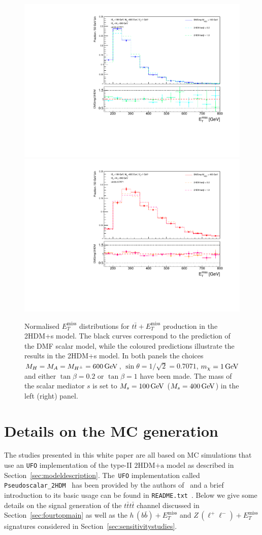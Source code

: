 \documentclass[a4paper, 11pt,notoc]{article}
\newcommand{\MET}{\ensuremath{E_T^\mathrm{miss}}\xspace}
\newcommand{\hdma}{\ensuremath{\textrm{2HDM+a}}\xspace}
\begin{document}
\begin{figure}
\centering
\includegraphics[width=.475\textwidth]{Met100GeV.pdf} \quad 
\includegraphics[width=.475\textwidth]{Met400GeV.pdf}
\vspace{2mm}
\caption{ Normalised $\MET$ distributions for $t \bar t + \MET$ production in the 2HDM+s model. The black curves correspond to the prediction of the DMF scalar   model, while the coloured predictions illustrate the results in the 2HDM+s  model. In both panels the choices $M_H = M_A = M_{H^\pm} = 600 \, {\rm GeV}$, $\sin\theta=1/\sqrt{2}=0.7071$, $m_\chi = 1 \, {\rm GeV}$ and either $\tan \beta = 0.2$ or $\tan \beta = 1$ have been made. The mass of the scalar mediator $s$ is set to $M_s = 100 \, {\rm GeV}$ ($M_s = 400 \, {\rm GeV}$) in the left (right) panel.}
\label{fig:ttMETscalar}
\end{figure}


\section{Details on the MC generation}
\label{app:mcgeneration}

The studies presented in this white paper are all based on MC simulations that use an {\tt UFO} implementation of the type-II \hdma model as described in Section~\ref{sec:modeldescription}. The~{\tt UFO} implementation  called {\tt Pseudoscalar\_2HDM}~\cite{hdmaUFO} has been provided by the authors of~\cite{Bauer:2017ota} and a brief introduction to its basic usage can be found in {\tt README.txt}~\cite{hdmaREADME}. Below we give some details on   the signal generation of the $t \bar t t \bar t$ channel discussed in Section~\ref{sec:fourtopmain} as well as  the $h \, (b \bar b) + \MET$ and $Z \, (\ell^+ \ell^-)+ \MET$ signatures  considered in Section~\ref{sec:sensitivitystudies}.
\end{document}
